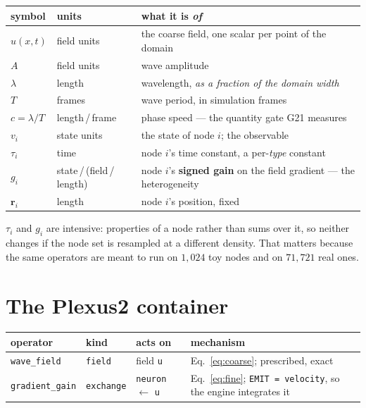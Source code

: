 \documentclass[11pt,a4paper]{article}
\newcommand{\code}[1]{\texttt{\small #1}}
\newcommand{\op}[1]{\texttt{\small #1}}
\begin{document}
\begin{center}
\begin{tabularx}{\textwidth}{@{}p{1.4cm}p{2.6cm}L@{}}
\toprule
\textbf{symbol} & \textbf{units} & \textbf{what it is \emph{of}} \\
\midrule
$u(x,t)$ & field units & the coarse field, one scalar per point of the domain \\
$A$ & field units & wave amplitude \\
$\lambda$ & length & wavelength, \emph{as a fraction of the domain width} \\
$T$ & frames & wave period, in simulation frames \\
$c = \lambda/T$ & length\,/\,frame & phase speed --- the quantity gate G21 measures \\
$v_i$ & state units & the state of node $i$; the observable \\
$\tau_i$ & time & node $i$'s time constant, a per-\emph{type} constant \\
$g_i$ & state\,/\,(field\,/\,length) & node $i$'s \textbf{signed gain} on the field gradient ---
  the heterogeneity \\
$\mathbf{r}_i$ & length & node $i$'s position, fixed \\
\bottomrule
\end{tabularx}
\end{center}

\noindent
$\tau_i$ and $g_i$ are intensive: properties of a node rather than sums over it, so neither changes
if the node set is resampled at a different density. That matters because the same operators are
meant to run on $1{,}024$ toy nodes and on $71{,}721$ real ones.

\section{The Plexus2 container}

\begin{center}
\begin{tabularx}{\textwidth}{@{}p{2.7cm}p{1.8cm}p{2.4cm}L@{}}
\toprule
\textbf{operator} & \textbf{kind} & \textbf{acts on} & \textbf{mechanism} \\
\midrule
\op{wave\_field} & \code{field} & field \code{u} & Eq.~\eqref{eq:coarse}; prescribed, exact \\
\op{gradient\_gain} & \code{exchange} & \code{neuron} $\leftarrow$ \code{u} &
  Eq.~\eqref{eq:fine}; \code{EMIT = velocity}, so the engine integrates it \\
\bottomrule
\end{tabularx}
\end{center}
\end{document}
